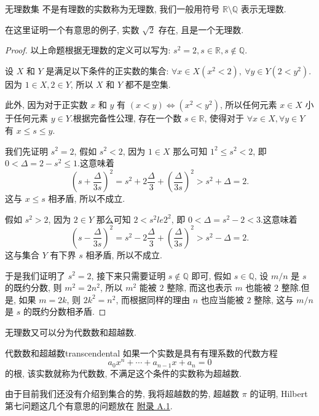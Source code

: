 \documentclass[cn,toc=twocol]{elegantbook}
\newcommand{\R}{\mathbb{R}}
\newcommand{\Q}{\mathbb{Q}}
\begin{document}
\begin{definition}{无理数集}
不是有理数的实数称为无理数, 我们一般用符号 $\R\setminus\Q$ 表示无理数.
\end{definition}
\smallskip

在这里证明一个有意思的例子, 实数 $\sqrt 2$ 存在, 且是一个无理数.
\begin{proof}

以上命题根据无理数的定义可以写为:  $s^2 = 2,  s\in \R,  s\notin \Q$.

设 $X$ 和 $Y$ 是满足以下条件的正实数的集合:  $\forall x \in X (x^2 < 2), \ \forall y \in Y (2 < y^2)$.因为 $1 \in X,  2 \in Y$, 所以 $X$ 和 $Y$ 都不是空集.

此外, 因为对于正实数 $x$ 和 $y$ 有 $(x < y) \Leftrightarrow (x^2 < y^2)$, 所以任何元素 $x \in X$ 小于任何元素 $y \in Y$.根据完备性公理, 存在一个数 $s \in \R$, 使得对于 $\forall x \in X,  \forall y \in Y$ 有 $x \le s \le y$.

我们先证明 $s^2 = 2$, 假如 $s^2 < 2$, 因为 $1 \in X$ 那么可知 $1^2 \le s^2 < 2$, 即 $0 < \Delta = 2 - s^2 \le 1$.这意味着
\[
	\left( s + \frac{\Delta}{3s} \right)^2 = s^2 + 2\frac{\Delta}{3} + \left( \frac{\Delta}{3s} \right)^2 > s^2 + \Delta = 2.
\]
这与 $x \le s$ 相矛盾, 所以不成立.

假如 $s^2 > 2$, 因为 $2 \in Y$ 那么可知 $2 < s^2 le 2^2$, 即 $0 < \Delta = s^2 - 2 <3$.这意味着
\[
	\left( s - \frac{\Delta}{3s} \right)^2 = s^2 - 2\frac{\Delta}{3} + \left( \frac{\Delta}{3s} \right)^2 > s^2 - \Delta = 2.
\]
这与集合 $Y$ 有下界 $s$ 相矛盾, 所以不成立.

于是我们证明了 $s^2 = 2$, 接下来只需要证明 $s \notin \Q$ 即可, 假如 $s \in \Q$, 设 $m/n$ 是 $s$ 的既约分数, 则 $m^2 = 2n^2$, 所以 $m^2$ 能被 $2$ 整除, 而这也表示 $m$ 也能被 $2$ 整除.但是, 如果 $m = 2k$, 则 $2k^2 = n^2$, 而根据同样的理由 $n$ 也应当能被 $2$ 整除, 这与 $m/n$ 是 $s$ 的既约分数相矛盾.

\end{proof}
\smallskip

无理数又可以分为代数数和超越数.

\begin{definition}{代数数和超越数}{transcendental}
如果一个实数是具有有理系数的代数方程
\[
	a_0 x^n + \cdots + a_{n-1} x + a_n = 0
\]
的根, 该实数就称为代数数, 不满足这个条件的实数称为超越数.
\end{definition}

由于目前我们还没有介绍到集合的势, 我将超越数的势, 超越数 $\pi$ 的证明, Hilbert 第七问题这几个有意思的问题放在 \hyperlink{A1}{附录 A.1}.
\end{document}
